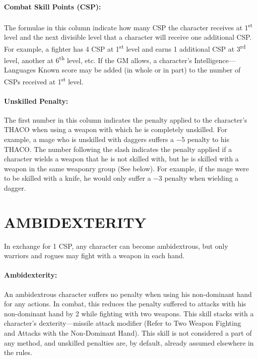 \begin{multicols}{2}
\paragraph{Combat Skill Points (CSP):} The formulae in this column indicate how many CSP the character receives at 1\textsuperscript{st} level and the next divisible level that a character will receive one additional CSP.  For example, a fighter has 4 CSP at 1\textsuperscript{st} level and earns 1 additional CSP at 3\textsuperscript{rd} level, another at 6\textsuperscript{th} level, etc.  If the GM allows, a character's Intelligence---Languages Known score may be added (in whole or in part) to the number of CSPs received at 1\textsuperscript{st} level.

\paragraph{Unskilled Penalty:} The first number in this column indicates the penalty applied to the character's THACO when using a weapon with which he is completely unskilled.  For example, a mage who is unskilled with daggers suffers a $-5$ penalty to his THACO.  The number following the slash indicates the penalty applied if a character wields a weapon that he is not skilled with, but he is skilled with a weapon in the same weaponry group (See below).  For example, if the mage were to be skilled with a knife, he would only suffer a $-3$ penalty when wielding a dagger.

\section{AMBIDEXTERITY}

In exchange for 1 CSP, any character can become ambidextrous, but only warriors and rogues may fight with a weapon in each hand.  

\paragraph{Ambidexterity:} An ambidextrous character suffers no penalty when using his non-dominant hand for any actions.  In combat, this reduces the penalty suffered to attacks with his non-dominant hand by 2 while fighting with two weapons.  This skill stacks with a character's dexterity---missile attack modifier (Refer to Two Weapon Fighting and Attacks with the Non-Dominant Hand).  This skill is not considered a part of any method, and unskilled penalties are, by default, already assumed elsewhere in the rules.


\end{multicols}
